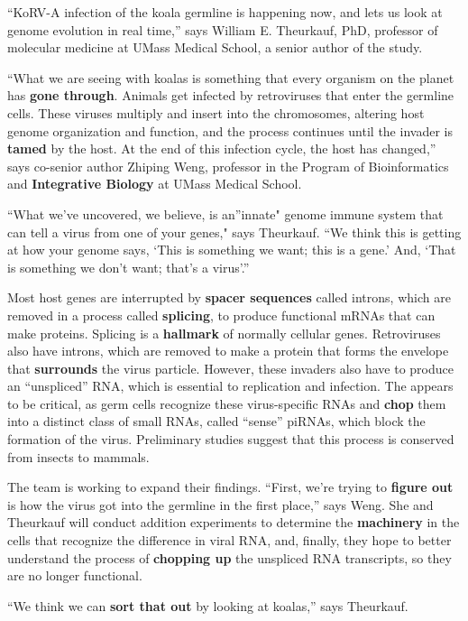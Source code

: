 \documentclass[]{article}
\begin{document}
``KoRV-A infection of the koala germline is happening now, and lets us
look at genome evolution in real time,'' says William E. Theurkauf, PhD,
professor of molecular medicine at UMass Medical School, a senior author
of the study.

``What we are seeing with koalas is something that every organism on the
planet has \textbf{gone through}. Animals get infected by retroviruses
that enter the germline cells. These viruses multiply and insert into
the chromosomes, altering host genome organization and function, and the
process continues until the invader is \textbf{tamed} by the host. At
the end of this infection cycle, the host has changed,'' says co-senior
author Zhiping Weng, professor in the Program of Bioinformatics and
\textbf{Integrative Biology} at UMass Medical School.

``What we've uncovered, we believe, is an''innate" genome immune system
that can tell a virus from one of your genes," says Theurkauf. ``We
think this is getting at how your genome says, `This is something we
want; this is a gene.' And, `That is something we don't want; that's a
virus'.''

Most host genes are interrupted by \textbf{spacer sequences} called
introns, which are removed in a process called \textbf{splicing}, to
produce functional mRNAs that can make proteins. Splicing is a
\textbf{hallmark} of normally cellular genes. Retroviruses also have
introns, which are removed to make a protein that forms the envelope
that \textbf{surrounds} the virus particle. However, these invaders also
have to produce an ``unspliced'' RNA, which is essential to replication
and infection. The appears to be critical, as germ cells recognize these
virus-specific RNAs and \textbf{chop} them into a distinct class of
small RNAs, called ``sense'' piRNAs, which block the formation of the
virus. Preliminary studies suggest that this process is conserved from
insects to mammals.

The team is working to expand their findings. ``First, we're trying to
\textbf{figure out} is how the virus got into the germline in the first
place,'' says Weng. She and Theurkauf will conduct addition experiments
to determine the \textbf{machinery} in the cells that recognize the
difference in viral RNA, and, finally, they hope to better understand
the process of \textbf{chopping up} the unspliced RNA transcripts, so
they are no longer functional.

``We think we can \textbf{sort that out} by looking at koalas,'' says
Theurkauf.
\end{document}
